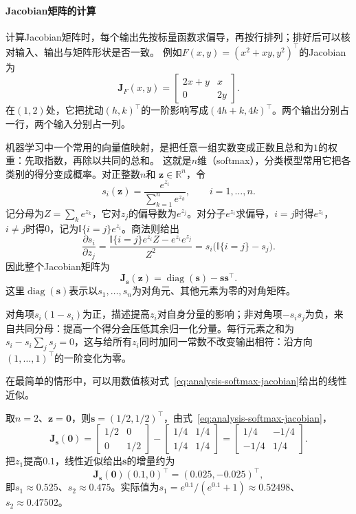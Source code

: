\paragraph{Jacobian矩阵的计算}
计算Jacobian矩阵时，每个输出先按标量函数求偏导，再按行排列；排好后可以核对输入、输出与矩阵形状是否一致。
例如$F(x,y)=(x^2+xy,y^2)^\top$的Jacobian为
\[
 \bm J_F(x,y)=\begin{bmatrix}2x+y&x\\0&2y\end{bmatrix}.
\]
在$(1,2)$处，它把扰动$(h,k)^\top$的一阶影响写成$(4h+k,4k)^\top$。两个输出分别占一行，两个输入分别占一列。

机器学习中一个常用的向量值映射，是把任意一组实数变成正数且总和为$1$的权重：先取指数，再除以共同的总和。
这就是$n$维（softmax），分类模型常用它把各类别的得分变成概率。对正整数$n$和
$\bm{z}\in\mathbb{R}^n$，令
\[
  s_i(\bm{z})
  =
  \frac{e^{z_i}}{\sum_{k=1}^n e^{z_k}},
  \qquad i=1,\ldots,n.
\]
记分母为$Z=\sum_k e^{z_k}$，它对$z_j$的偏导数为$e^{z_j}$。对分子$e^{z_i}$求偏导，$i=j$时得$e^{z_i}$，$i\neq j$时得$0$，记为$\mathbb{I}\{i=j\}e^{z_i}$。商法则给出
\[
  \frac{\partial s_i}{\partial z_j}
  =
  \frac{\mathbb{I}\{i=j\}e^{z_i}Z-e^{z_i}e^{z_j}}{Z^2}
  =
  s_i\bigl(\mathbb{I}\{i=j\}-s_j\bigr).
\]
因此整个Jacobian矩阵为
\begin{equation}
  \bm{J}_{\bm{s}}(\bm{z})
  =
  \operatorname{diag}(\bm{s})-\bm{s}\bm{s}^{\top}.
\label{eq:analysis-softmax-jacobian}
\end{equation}
这里$\operatorname{diag}(\bm s)$表示以$s_1,\ldots,s_n$为对角元、其他元素为零的对角矩阵。

对角项$s_i(1-s_i)$为正，描述提高$z_i$对自身分量的影响；非对角项$-s_is_j$为负，来自共同分母：提高一个得分会压低其余归一化分量。每行元素之和为$s_i-s_i\sum_js_j=0$，这与给所有$z_i$同时加同一常数不改变输出相符：沿方向$(1,\ldots,1)^\top$的一阶变化为零。

在最简单的情形中，可以用数值核对式~\eqref{eq:analysis-softmax-jacobian}给出的线性近似。
\begin{example}[二维softmax的Jacobian矩阵]
\label{ex:multivariable-softmax-jacobian-check}
取$n=2$、$\bm z=\bm 0$，则$\bm s=(1/2,1/2)^\top$，由式~\eqref{eq:analysis-softmax-jacobian}，
\[
 \bm J_{\bm s}(\bm 0)
 =\begin{bmatrix}1/2&0\\0&1/2\end{bmatrix}-\begin{bmatrix}1/4&1/4\\1/4&1/4\end{bmatrix}
 =\begin{bmatrix}1/4&-1/4\\-1/4&1/4\end{bmatrix}.
\]
把$z_1$提高$0.1$，线性近似给出$\bm s$的增量约为
\[
 \bm J_{\bm s}(\bm 0)(0.1,0)^\top=(0.025,-0.025)^\top,
\]
即$s_1\approx0.525$、$s_2\approx0.475$。实际值为$s_1=e^{0.1}/(e^{0.1}+1)\approx0.52498$、$s_2\approx0.47502$。
\end{example}

